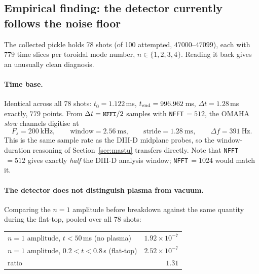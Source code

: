 \documentclass[11pt,a4paper]{article}
\newcommand{\code}[1]{\texttt{\small #1}}
\begin{document}
\subsection{Empirical finding: the detector currently follows the noise floor}
\label{sec:noisefloor}

The collected pickle holds 78 shots (of 100 attempted, $47000$--$47099$), each with
$779$ time slices per toroidal mode number, $n \in \{1,2,3,4\}$. Reading it back gives an
unusually clean diagnosis.

\paragraph{Time base.} Identical across all 78 shots: $t_0 = 1.122$\,ms,
$t_{\rm end} = 996.962$\,ms, $\Delta t = 1.28$\,ms exactly, $779$ points. From
$\Delta t = \code{NFFT}/2$ samples with \code{NFFT}$\,=512$, the OMAHA \emph{slow}
channels digitise at
\begin{equation}
F_s = 200\ \text{kHz},
\qquad
\text{window} = 2.56\ \text{ms},
\qquad
\text{stride} = 1.28\ \text{ms},
\qquad
\Delta f = 391\ \text{Hz}.
\end{equation}
This is the same sample rate as the DIII-D midplane probes, so the window-duration
reasoning of Section~\ref{sec:mastu} transfers directly. Note that \code{NFFT}$\,=512$
gives exactly \emph{half} the DIII-D analysis window; \code{NFFT}$\,=1024$ would match it.

\paragraph{The detector does not distinguish plasma from vacuum.} Comparing the $n=1$
amplitude before breakdown against the same quantity during the flat-top, pooled over all
78 shots:

\begin{center}
\begin{tabular}{@{}lr@{}}
\toprule
$n=1$ amplitude, $t < 50$\,ms (no plasma) & $1.92\times10^{-7}$ \\
$n=1$ amplitude, $0.2 < t < 0.8$\,s (flat-top) & $2.52\times10^{-7}$ \\
\midrule
ratio & $1.31$ \\
\bottomrule
\end{tabular}
\end{center}
\end{document}
